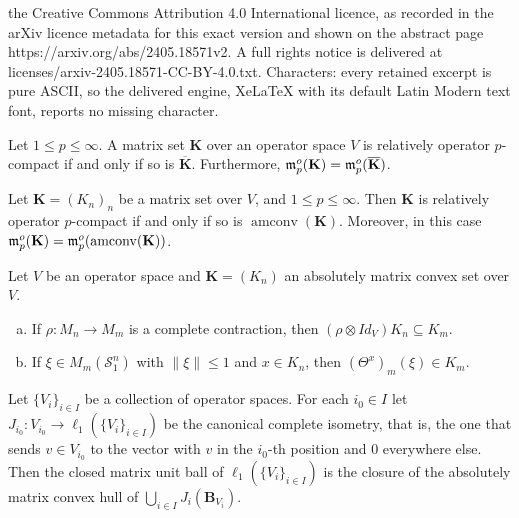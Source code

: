 \documentclass[10pt,a4paper]{amsart}
\DeclareMathOperator{\amconv}{amconv}
\newcommand{\n}[1]{ \left\|#1\right\| }
\begin{document}
the Creative Commons Attribution 4.0 International licence, as recorded in the arXiv licence metadata for this exact version and shown on the abstract page https://arxiv.org/abs/2405.18571v2. A full rights notice is delivered at licenses/arxiv-2405.18571-CC-BY-4.0.txt. Characters: every retained excerpt is pure ASCII, so the delivered engine, XeLaTeX with its default Latin Modern text font, reports no missing character.
\begin{lemma}\label{lemma-p-compact-closure}
Let $1 \le p \le \infty$.
A matrix set $\mathbf{K}$ over an operator space $V$ is relatively operator $p$-compact if and only if so is $\overline{\mathbf{K}}$. Furthermore, $\frak m_p^o(\mathbf{K}) = \frak m_p^o(\overline{\mathbf{K}})$.
\end{lemma}

\begin{lemma}\label{lemma-amconv-preserves-p-compactness}
Let $\mathbf{K}=(K_n)_n$ be a matrix set over $V$, and $1\le p \le \infty$. Then $\mathbf{K}$ is relatively operator $p$-compact if and only if so is $\amconv(\mathbf{K})$. Moreover, in this case $\frak m_p^o(\mathbf{K}) =\frak m_p^o(\amconv(\mathbf{K}))$.
\end{lemma}

\begin{lemma}\label{lemma:abs-matrix-convex-properties}
Let $V$ be an operator space and $\mathbf{K} = (K_n)$ an absolutely matrix convex  set over $V$.
\begin{enumerate}[(a)]
\item If $\rho : M_n \to M_m$ is a complete contraction, then $(\rho \otimes Id_V) K_n \subseteq K_m$.
\item If $\xi \in M_m(\mathcal{S}_1^n)$ with $\n{\xi} \le 1$ and $x \in K_n$, then
$(\Theta^x)_m(\xi) \in K_m$.
\end{enumerate}
\end{lemma}

\begin{proposition}\label{prop-matrix-unit-ball-of-ell1-sum}
Let $\{V_i\}_{i \in I}$ be a collection of operator spaces. For each $i_0\in I$ let $J_{i_0} : V_{i_0} \to \ell_1( \{ V_i\}_{i \in I} )$ be the canonical complete isometry, that is, the one that sends $v \in V_{i_0}$ to the vector with $v$ in the $i_0$-th position and 0 everywhere else.
Then the closed matrix unit ball of $\ell_1( \{ V_i\}_{i \in I} )$ is the closure of the absolutely matrix convex hull of $\bigcup_{i\in I} J_i(\mathbf{B}_{V_i})$.
\end{proposition}
\end{document}
